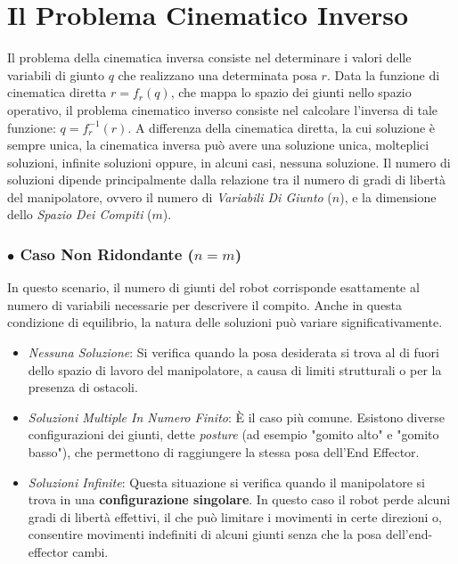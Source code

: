 \documentclass[11pt, a4paper]{report}
\begin{document}
\newpage
\section{Il Problema Cinematico Inverso}
Il problema della cinematica inversa consiste nel determinare i valori delle variabili di giunto \( q \) che realizzano una determinata posa \( r \). Data la funzione di cinematica diretta \(r = f_{r}(q)\), che mappa lo spazio dei giunti nello spazio operativo, il problema cinematico inverso consiste nel calcolare l'inversa di tale funzione: \(q = f_{r}^{-1}(r)\). A differenza della cinematica diretta, la cui soluzione è sempre unica, la cinematica inversa può avere una soluzione unica, molteplici soluzioni, infinite soluzioni oppure, in alcuni casi, nessuna soluzione. Il numero di soluzioni dipende principalmente dalla relazione tra il numero di gradi di libertà del manipolatore, ovvero il numero di \textit{Variabili Di Giunto} (\(n\)), e la dimensione dello \textit{Spazio Dei Compiti} (\(m\)).
\subsubsection*{\(\bullet\) Caso Non Ridondante ($n = m$)}
In questo scenario, il numero di giunti del robot corrisponde esattamente al numero di variabili necessarie per descrivere il compito. Anche in questa condizione di equilibrio, la natura delle soluzioni può variare significativamente.
\begin{itemize}
    \item \textit{Nessuna Soluzione}: Si verifica quando la posa desiderata si trova al di fuori dello spazio di lavoro del manipolatore, a causa di limiti strutturali o per la presenza di ostacoli.
    \item \textit{Soluzioni Multiple In Numero Finito}: È il caso più comune. Esistono diverse configurazioni dei giunti, dette \textit{posture} (ad esempio "gomito alto" e "gomito basso"), che permettono di raggiungere la stessa posa dell'End Effector.
    \item \textit{Soluzioni Infinite}: Questa situazione si verifica quando il manipolatore si trova in una \textbf{configurazione singolare}. In questo caso il robot perde alcuni gradi di libertà effettivi, il che può limitare i movimenti in certe direzioni o, consentire movimenti indefiniti di alcuni giunti senza che la posa dell'end-effector cambi.
\end{itemize}
\end{document}
